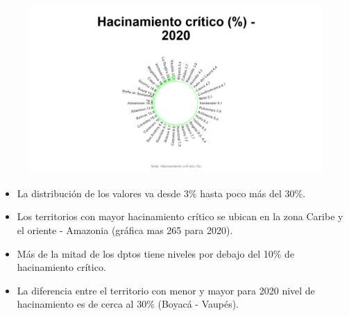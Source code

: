     \begin{figure}[H]
        \caption[Hacinamiento por departamentos para 2020 ]{\label{hacinamiento_dptos} }
        \begin{center}
        \includegraphics[width=\textwidth,keepaspectratio]{img/var_265_static.png}
        \end{center}
    \end{figure}
            \begin{itemize}
                    \item La distribución de los valores va desde 3\% hasta poco más del 30\%.
                    \item Los territorios con mayor hacinamiento crítico se ubican en la zona Caribe y el oriente - Amazonia (gráfica mas 265 para 2020).
                    \item Más de la mitad de los dptos tiene niveles por debajo del 10\% de hacinamiento crítico.
                    \item La diferencia entre el territorio con menor y mayor para 2020 nivel de hacinamiento es de cerca al 30\% (Boyacá - Vaupés).
                    \end{itemize}

